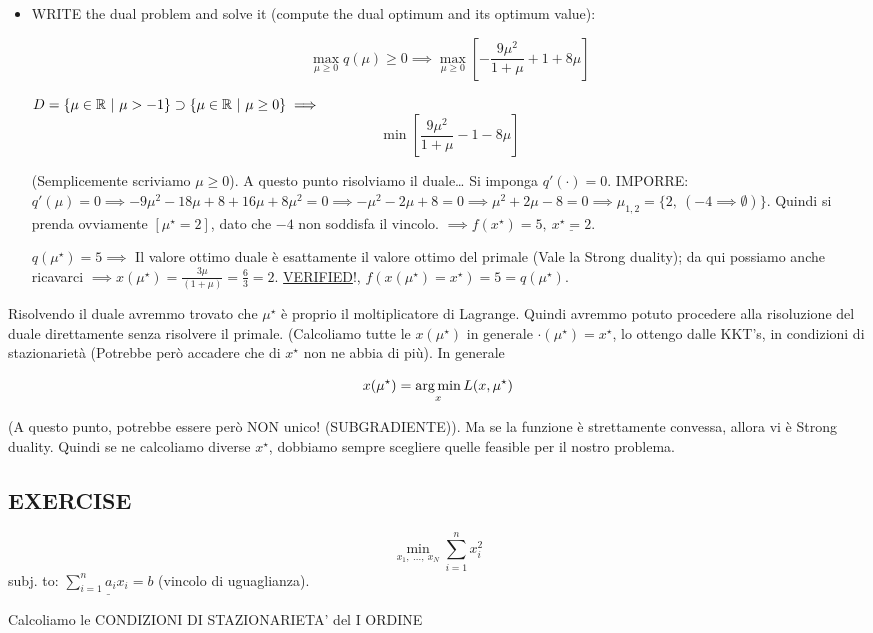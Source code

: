\begin{itemize}
\item WRITE the dual problem and solve it (compute the dual optimum and its optimum value):

\[	
	\max_{\mu\geq 0}{q(\mu)\geq 0} \implies \max_{\mu\geq 0}{[-\frac{9\mu^2}{1+\mu} +1+8\mu]}
\]

$D = \{\mu\in\mathbb{R}\ |\ \mu>-1\} \supset \{\mu\in\mathbb{R}\ |\ \mu\geq 0\} \implies$
\[
	\min{[\frac{9\mu^2}{1+\mu} -1-8\mu]}
\]

(Semplicemente scriviamo $\mu\geq 0$).
A questo punto risolviamo il duale\dots
Si imponga $q'(\mathord{\cdot})=0$. IMPORRE: $q'(\mu) = 0 \implies -9\mu^2 - 18\mu +8+16\mu+8\mu^2 = 0 \implies -\mu^2-2\mu+8 = 0 \implies \mu^2+2\mu-8 = 0\implies \mu_{1,2} = \{2,\ (-4\implies \emptyset)\}$. 
Quindi si prenda ovviamente $[\mu^\star = 2]$, dato che $-4$ non soddisfa il vincolo.
$\implies f(x^\star) = 5,\ \underline{x^\star = 2}$.

$q(\mu^\star) = 5 \implies$ Il valore ottimo duale è esattamente il valore ottimo del primale (Vale la Strong duality); da qui possiamo anche ricavarci $\implies x(\mu^\star) = \frac{3\mu}{(1+\mu)} = \frac{6}{3} = 2$. \underline{VERIFIED}!, $f(x(\mu^\star) = x^\star) = 5 = q(\mu^\star)$.

\end{itemize}

Risolvendo il duale avremmo trovato che $\mu^\star$ è proprio il moltiplicatore di Lagrange. Quindi avremmo potuto procedere alla risoluzione del duale direttamente senza risolvere il primale. (Calcoliamo tutte le $x(\mu^\star)$ in generale $\mathord{\cdot}(\mu^\star) = x^\star$, lo ottengo dalle KKT's, in condizioni di stazionarietà (Potrebbe però accadere che di $x^\star$ non ne abbia di più). In generale

\[
	x(\mu^\star) = \operatorname*{arg\,min}_x{L(x,\mu^\star)}
\]

(A questo punto, potrebbe essere però NON unico! (SUBGRADIENTE)). 
Ma se la funzione è strettamente convessa, allora vi è Strong duality. Quindi se ne calcoliamo diverse $x^\star$, dobbiamo sempre scegliere quelle feasible per il nostro problema.

\subsection{EXERCISE}

\[
	\min_{x_1,\ \dots,\ x_N}{\sum_{i=1}^n{x_i^2}}
\]
subj. to: $\underline{\sum_{i=1}^n{a_ix_i = b}}$ (vincolo di uguaglianza).

Calcoliamo le CONDIZIONI DI STAZIONARIETA' del I ORDINE

